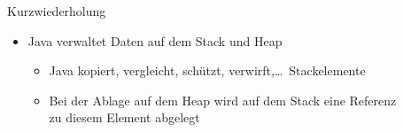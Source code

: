 {\begin{frame}[fragile,c]{Kurzwiederholung}
\begin{itemize}[<+(1)->]
\begin{plainjava}
\end{plainjava}
\endcolumns\medskip
        \item<14-> Java verwaltet Daten auf dem Stack  und Heap  \begin{itemize}
            \item<15-> Java kopiert, vergleicht, schützt, verwirft,\ldots\ Stackelemente
            \item<16-> Bei der Ablage auf dem Heap wird auf dem Stack eine Referenz\\zu diesem Element abgelegt 
        \end{itemize}
    \end{itemize}
\end{frame}
}\fi
\SetNextSectionText[.55\linewidth]{}
